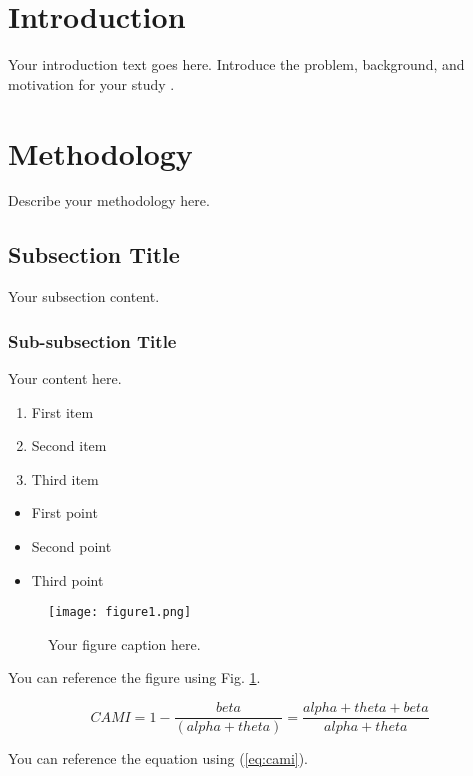 \documentclass[conference]{IEEEtran}
\begin{document}
\section{Introduction}
Your introduction text goes here. Introduce the problem, background, and motivation for your study \cite{ref1}.

\section{Methodology}
Describe your methodology here.

\subsection{Subsection Title}
Your subsection content.

\subsubsection{Sub-subsection Title}
Your content here.

\begin{enumerate}
    \item First item
    \item Second item
    \item Third item
\end{enumerate}

\begin{itemize}
    \item First point
    \item Second point
    \item Third point
\end{itemize}

\begin{figure}[htbp]
\centerline{\texttt{[image: figure1.png]}}
\caption{Your figure caption here.}
\label{fig:example}
\end{figure}

You can reference the figure using Fig. \ref{fig:example}.

\begin{equation}
CAMI = 1 - \frac{beta}{(alpha+theta)} = \frac{alpha+theta+beta}{alpha+theta}
\label{eq:cami}
\end{equation}

You can reference the equation using (\ref{eq:cami}).
\end{document}
